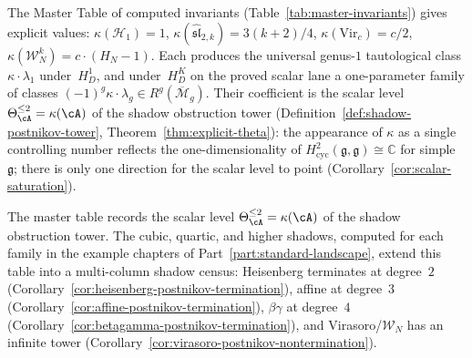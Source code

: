 \begin{remark}\label{rem:tautological-master-table}
The Master Table of computed invariants
(Table~\ref{tab:master-invariants}) gives explicit values:
$\kappa(\mathcal{H}_1) = 1$,
$\kappa(\widehat{\mathfrak{sl}}_{2,k}) = 3(k+2)/4$,
$\kappa(\mathrm{Vir}_c) = c/2$,
$\kappa(\mathcal{W}_N^k) = c \cdot (H_N - 1)$. Each produces the
universal genus-$1$ tautological class $\kappa \cdot \lambda_1$
under~$H_D^1$, and
under~$H_D^K$ on the proved scalar lane a one-parameter family of
classes $(-1)^g\kappa \cdot \lambda_g
\in R^g(\overline{\mathcal{M}}_g)$.  Their coefficient is the scalar level
$\Theta_{\cA}^{\leq 2} = \kappa(\cA)$ of the shadow obstruction tower
(Definition~\ref{def:shadow-postnikov-tower},
Theorem~\ref{thm:explicit-theta}):
the appearance of $\kappa$ as a single controlling number
reflects the one-dimensionality of
$H^2_{\mathrm{cyc}}(\mathfrak{g},\mathfrak{g}) \cong \mathbb{C}$
for simple~$\mathfrak{g}$; there is only one direction for
the scalar level to point
(Corollary~\ref{cor:scalar-saturation}).
\end{remark}

\begin{remark}
\label{rem:beyond-master-table}
The master table records the scalar level
$\Theta_\cA^{\leq 2} = \kappa(\cA)$ of the shadow obstruction tower.
The cubic, quartic, and higher shadows, computed for each family
in the example chapters of Part~\ref{part:standard-landscape}, extend this table into a
multi-column shadow census: Heisenberg terminates at degree~$2$
(Corollary~\ref{cor:heisenberg-postnikov-termination}),
affine at degree~$3$
(Corollary~\ref{cor:affine-postnikov-termination}),
$\beta\gamma$ at degree~$4$
(Corollary~\ref{cor:betagamma-postnikov-termination}),
and Virasoro/$\mathcal{W}_N$ has an infinite tower
(Corollary~\ref{cor:virasoro-postnikov-nontermination}).
\end{remark}

